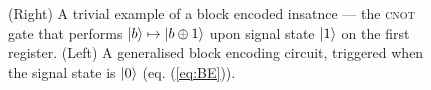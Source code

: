 \documentclass{article}
\begin{document}
\begin{figure}[!ht]
    \centering
    \caption{(Right) A trivial example of a block encoded insatnce ---  the \textsc{cnot} gate that performs $\ket{b}\mapsto\ket{b\oplus 1}$ upon signal state $\ket{1}$ on the first register. (Left) A generalised block encoding circuit, triggered when the signal state is $\ket{0}$ (eq. (\ref{eq:BE})).}
    \label{fig:BE_diagram}
\end{figure}
\end{document}
